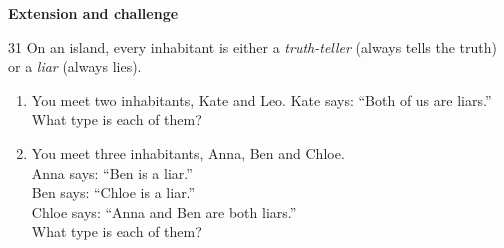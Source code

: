 \documentclass[11pt]{article}
\newenvironment{probbox}[2]{\begin{probboxT}{#1}{#2}}{\end{probboxT}}
\newcommand{\dividerbar}[1]{\par\vspace{0.6em}\noindent
  \begin{tcolorbox}[enhanced,frame hidden,interior hidden,borderline west={5pt}{0pt}{ProbBlue},
    colback=white,left=12pt,right=12pt,top=5pt,bottom=5pt,arc=4pt]
  {\large\bfseries\color{ProbBlue} #1}\end{tcolorbox}\vspace{0.4em}}
\begin{document}
\clearpage
\dividerbar{Extension and challenge}

\begin{probbox}{31}{\relax}
On an island, every inhabitant is either a \emph{truth-teller} (always tells the truth) or a \emph{liar} (always lies).
\begin{enumerate}[label=\alph*),leftmargin=1.6em,itemsep=1pt,topsep=2pt]
  \item You meet two inhabitants, Kate and Leo. Kate says: ``Both of us are liars.'' What type is each of them?
  \item You meet three inhabitants, Anna, Ben and Chloe.\\
  Anna says: ``Ben is a liar.''\\
  Ben says: ``Chloe is a liar.''\\
  Chloe says: ``Anna and Ben are both liars.''\\
  What type is each of them?
\end{enumerate}
\end{probbox}
\end{document}
